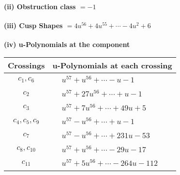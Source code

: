 \documentclass[1p]{elsarticle_modified}
\theoremstyle{definition}
\begin{document}
\flushleft \textbf{(ii) Obstruction class $= -1$}\\~\\
\flushleft \textbf{(iii) Cusp Shapes $= 4 u^{56}+4 u^{55}+\cdots-4 u^2+6$}\\~\\
\newpage\renewcommand{\arraystretch}{1}
\flushleft \textbf{(iv) u-Polynomials at the component}\newline \\
\begin{tabular}{m{50pt}|m{274pt}}
Crossings & \hspace{64pt}u-Polynomials at each crossing \\
\hline $$\begin{aligned}c_{1},c_{6}\end{aligned}$$&$\begin{aligned}
&u^{57}+u^{56}+\cdots- u-1
\end{aligned}$\\
\hline $$\begin{aligned}c_{2}\end{aligned}$$&$\begin{aligned}
&u^{57}+27 u^{56}+\cdots+u-1
\end{aligned}$\\
\hline $$\begin{aligned}c_{3}\end{aligned}$$&$\begin{aligned}
&u^{57}+7 u^{56}+\cdots+49 u+5
\end{aligned}$\\
\hline $$\begin{aligned}c_{4},c_{5},c_{9}\end{aligned}$$&$\begin{aligned}
&u^{57}- u^{56}+\cdots+u-1
\end{aligned}$\\
\hline $$\begin{aligned}c_{7}\end{aligned}$$&$\begin{aligned}
&u^{57}- u^{56}+\cdots+231 u-53
\end{aligned}$\\
\hline $$\begin{aligned}c_{8},c_{10}\end{aligned}$$&$\begin{aligned}
&u^{57}+u^{56}+\cdots-29 u-17
\end{aligned}$\\
\hline $$\begin{aligned}c_{11}\end{aligned}$$&$\begin{aligned}
&u^{57}+5 u^{56}+\cdots-264 u-112
\end{aligned}$\\
\hline
\end{tabular}\\~\\
\end{document}
